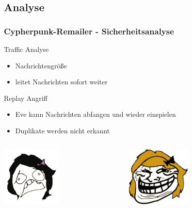 \documentclass{beamer}
\begin{document}
\subsection{Analyse}
\begin{frame}
	\frametitle{Cypherpunk-Remailer - Sicherheitsanalyse}
	\begin{alertblock}{Traffic Analyse}	
		\begin{itemize}	
			\item Nachrichtengröße
			\item leitet Nachrichten sofort weiter
		\end{itemize}	
	\end{alertblock}

	\begin{alertblock}{Replay Angriff}	
		\begin{itemize}	
			\item Eve kann Nachrichten abfangen und wieder einspielen
			\item Duplikate werden nicht erkannt
		\end{itemize}	
	\end{alertblock}

	\begin{columns}[T]
		\begin{column}[T]{5cm}
			\begin{center}
				\includegraphics[height=3cm]{bilder/alice_sad.jpg}
			\end{center}
		\end{column}
		\begin{column}[T]{5cm}
			\begin{center}	
				\includegraphics[height=3cm]{bilder/eve.jpg}
			\end{center}
		\end{column}
	\end{columns}	
\end{frame}
\end{document}
